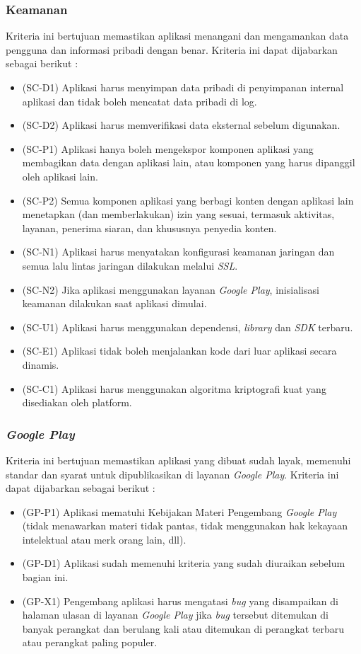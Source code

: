 \subsubsection{Keamanan}
Kriteria ini bertujuan memastikan aplikasi menangani dan mengamankan data pengguna dan informasi pribadi dengan benar\cite{androiddev}. Kriteria ini dapat dijabarkan sebagai berikut :
\begin{itemize}
    \item (SC-D1) Aplikasi harus menyimpan data pribadi di penyimpanan internal aplikasi dan tidak boleh mencatat data pribadi di log.
    \item (SC-D2) Aplikasi harus memverifikasi data eksternal sebelum digunakan.
    \item (SC-P1) Aplikasi hanya boleh mengekspor komponen aplikasi yang membagikan data dengan aplikasi lain, atau komponen yang harus dipanggil oleh aplikasi lain.
    \item (SC-P2) Semua komponen aplikasi yang berbagi konten dengan aplikasi lain menetapkan (dan memberlakukan) izin yang sesuai, termasuk aktivitas, layanan, penerima siaran, dan khususnya penyedia konten.
    \item (SC-N1) Aplikasi harus menyatakan konfigurasi keamanan jaringan dan semua lalu lintas jaringan dilakukan melalui \textit{SSL}.
    \item (SC-N2) Jika aplikasi menggunakan layanan \textit{Google Play}, inisialisasi keamanan dilakukan saat aplikasi dimulai.
    \item (SC-U1) Aplikasi harus menggunakan dependensi, \textit{library} dan \textit{SDK} terbaru.
    \item (SC-E1) Aplikasi tidak boleh menjalankan kode dari luar aplikasi secara dinamis.
    \item (SC-C1) Aplikasi harus menggunakan algoritma kriptografi kuat yang disediakan oleh platform.
\end{itemize}       

\subsubsection{\textit{Google Play}}
Kriteria ini bertujuan memastikan aplikasi yang dibuat sudah layak, memenuhi standar dan syarat untuk dipublikasikan di layanan \textit{Google Play}\cite{androiddev}. Kriteria ini dapat dijabarkan sebagai berikut :
\begin{itemize}
    \item (GP-P1) Aplikasi mematuhi Kebijakan Materi Pengembang \textit{Google Play} (tidak menawarkan materi tidak pantas, tidak menggunakan hak kekayaan intelektual atau merk orang lain, dll).
    \item (GP-D1) Aplikasi sudah memenuhi kriteria yang sudah diuraikan sebelum bagian ini.
    \item (GP-X1) Pengembang aplikasi harus mengatasi \textit{bug} yang disampaikan di halaman ulasan di layanan \textit{Google Play} jika \textit{bug} tersebut ditemukan di banyak perangkat dan berulang kali atau ditemukan di perangkat terbaru atau perangkat paling populer.    
\end{itemize}  


